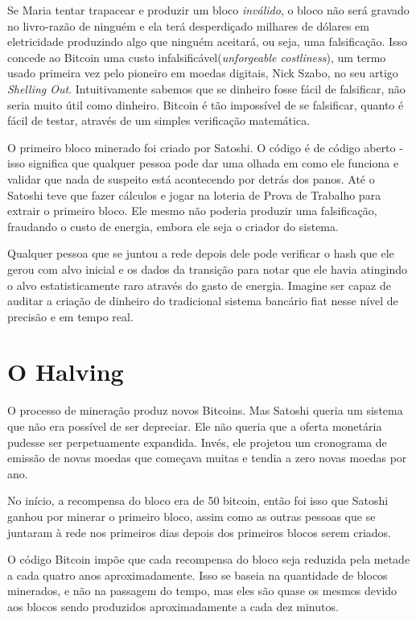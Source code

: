Se Maria tentar trapacear e produzir um bloco \textit{inválido}, o bloco não será gravado no livro-razão de ninguém e ela terá desperdiçado milhares de dólares em eletricidade produzindo algo que ninguém aceitará, ou seja, uma falsificação.
Isso concede ao Bitcoin uma custo infalsificável(\textit{unforgeable costliness}), um termo usado primeira vez pelo pioneiro em moedas digitais, Nick Szabo, no seu artigo \textit{Shelling Out}. Intuitivamente sabemos que se dinheiro fosse fácil de falsificar, não seria muito útil como dinheiro. Bitcoin é tão impossível de se falsificar, quanto é fácil de testar, através de um simples verificação matemática.
  
O primeiro bloco minerado foi criado por Satoshi. O código é de código aberto - isso significa que qualquer pessoa pode dar uma olhada em como ele funciona e validar que nada de suspeito está acontecendo por detrás dos panos. Até o Satoshi teve que fazer cálculos e jogar na loteria de Prova de Trabalho para extrair o primeiro bloco.
Ele mesmo não poderia produzir uma falsificação, fraudando o custo de energia, embora ele seja o criador do sistema.

Qualquer pessoa que se juntou a rede depois dele pode verificar o hash que ele gerou com alvo inicial e os dados da transição para notar que ele havia atingindo o alvo estatisticamente raro através do gasto de energia. Imagine ser capaz de auditar a criação de dinheiro do tradicional sistema bancário fiat nesse nível de precisão e em tempo real.

\section*{O Halving}
O processo de mineração produz novos Bitcoins. Mas Satoshi queria um sistema que não era possível de ser depreciar. Ele não queria que a oferta monetária pudesse ser perpetuamente expandida. Invés, ele projetou um cronograma de emissão de novas moedas que começava muitas e tendia a zero novas moedas por ano.

No início, a recompensa do bloco era de 50 bitcoin, então foi isso que Satoshi ganhou por minerar o primeiro bloco, assim como as outras pessoas que se juntaram à rede nos primeiros dias depois dos primeiros blocos serem criados.

O código Bitcoin impõe que cada recompensa do bloco seja reduzida pela metade a cada quatro anos aproximadamente. Isso se baseia na quantidade de blocos minerados, e não na passagem do tempo, mas eles são quase os mesmos devido aos blocos sendo produzidos aproximadamente a cada dez minutos.

